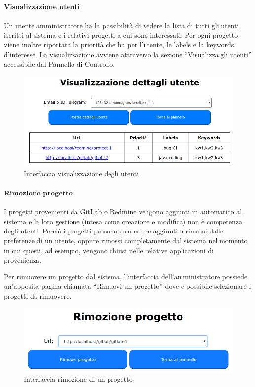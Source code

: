 \paragraph{Visualizzazione utenti} \label{VisUtenti}
Un utente amministratore ha la possibilità di vedere la lista di tutti gli utenti iscritti al sistema e i relativi progetti a cui sono interessati.
Per ogni progetto viene inoltre riportata la priorità che ha per l'utente, le labels e la keywords d'interesse.
La visualizzazione avviene attraverso la sezione ``Visualizza gli utenti'' accessibile dal Pannello di Controllo.
\begin{figure}[H]
	\centering
	\includegraphics[width=12cm]{img/user_details.png}
	\caption{Interfaccia visualizzazione degli utenti}
\end{figure}

\paragraph{Rimozione progetto}
I progetti provenienti da GitLab o Redmine vengono aggiunti in automatico al sistema e la loro gestione (intesa come creazione e modifica) non è competenza degli utenti. Perciò i progetti possono solo essere aggiunti o rimossi dalle preferenze di un utente, oppure rimossi completamente dal sistema nel momento in cui questi, ad esempio, vengono chiusi nelle relative applicazioni di provenienza. \par
Per rimuovere un progetto dal sistema, l'interfaccia dell'amministratore possiede un'apposita pagina chiamata ``Rimuovi un  progetto'' dove è possibile selezionare i progetti da rimuovere.
\begin{figure}[H]
    \centering
	\includegraphics[width=12cm]{img/rimozioneprog.png}
	\caption{Interfaccia rimozione di un progetto }
\end{figure}

